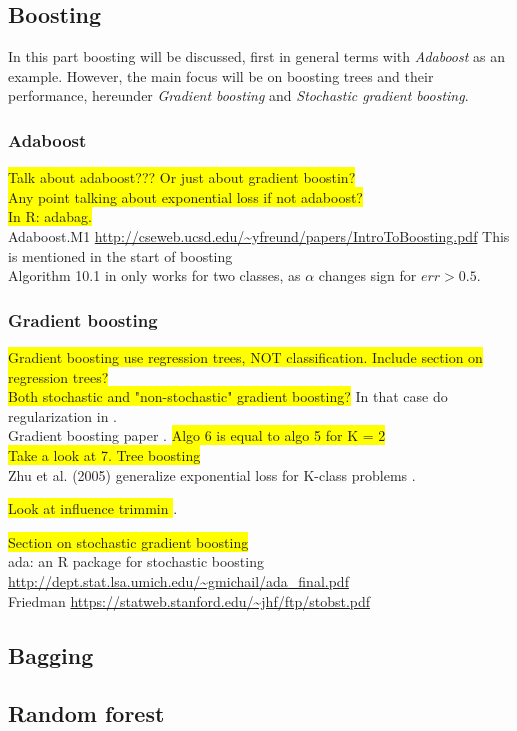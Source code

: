 \subsection{Boosting}
\label{subsub:Boosting}
In this part boosting will be discussed, first in general terms with \textit{Adaboost} as an example. However, the main focus will be on boosting trees and their performance, hereunder \textit{Gradient boosting} and \textit{Stochastic gradient boosting}.
\subsubsection{Adaboost}
\label{subsub:Adaboost}
\colorbox{yellow}{Talk about adaboost??? Or just about gradient boostin?}\\
\colorbox{yellow}{Any point talking about exponential loss if not adaboost?}\\
\colorbox{yellow}{In R: adabag.}\\
Adaboost.M1 \url{http://cseweb.ucsd.edu/~yfreund/papers/IntroToBoosting.pdf} This is mentioned in the start of boosting \cite{modstat} \\
Algorithm 10.1 in \cite{modstat} only works for two classes, as $\alpha$ changes sign for $err > 0.5$.

\subsubsection{Gradient boosting}
\label{subsub:Gradient boosting}
\colorbox{yellow}{Gradient boosting use regression trees, NOT classification. Include section on regression trees?} \\
\colorbox{yellow}{Both stochastic and "non-stochastic" gradient boosting?} In that case do regularization in \cite{modstat}.
\\ Gradient boosting paper \cite{friedman}. \colorbox{yellow}{Algo 6 is equal to algo 5  for K = 2}\\
\colorbox{yellow}{Take a look at 7. Tree boosting \cite[p.~22]{friedman}} \\
Zhu et al. (2005) generalize exponential loss for K-class problems \cite[p.~349]{modstat}.

\colorbox{yellow}{Look at influence trimmin \cite{friedman}}.










\colorbox{yellow}{Section on stochastic gradient boosting}\\
ada: an R package for stochastic boosting \url{http://dept.stat.lsa.umich.edu/~gmichail/ada_final.pdf} \\
Friedman \url{https://statweb.stanford.edu/~jhf/ftp/stobst.pdf} \\
\subsection{Bagging}
\label{sub:Bagging}

\subsection{Random forest}
\label{sub:Random forest}

